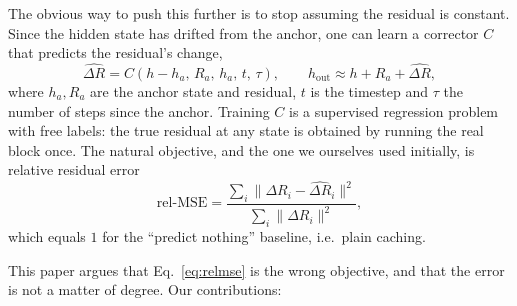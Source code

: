 \documentclass[10pt,twocolumn,letterpaper]{article}
\newcommand{\relmse}{\mathrm{rel\text{-}MSE}}
\newcommand{\dR}{\Delta R}
\begin{document}
The obvious way to push this further is to stop assuming the residual is constant.
Since the hidden state has drifted from the anchor, one can learn a corrector $C$
that predicts the residual's change,
\begin{equation}
\hat{\dR} = C\!\left(h - h_a,\, R_a,\, h_a,\, t,\, \tau\right),
\qquad
h_{\text{out}} \approx h + R_a + \hat{\dR},
\label{eq:corrector}
\end{equation}
where $h_a, R_a$ are the anchor state and residual, $t$ is the timestep and
$\tau$ the number of steps since the anchor. Training $C$ is a supervised regression
problem with free labels: the true residual at any state is obtained by running the
real block once. The natural objective, and the one we ourselves used initially, is
relative residual error
\begin{equation}
\relmse = \frac{\sum_i \lVert \dR_i - \hat{\dR}_i \rVert^2}{\sum_i \lVert \dR_i \rVert^2},
\label{eq:relmse}
\end{equation}
which equals $1$ for the ``predict nothing'' baseline, i.e.\ plain caching.

This paper argues that Eq.~\ref{eq:relmse} is the wrong objective, and that the error
is not a matter of degree. Our contributions:
\end{document}

